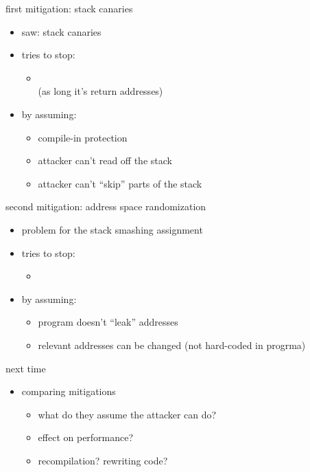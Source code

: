 \begin{frame}{first mitigation: stack canaries}
    \begin{itemize}
    \item saw: stack canaries
    \item tries to stop:
        \begin{itemize}
        \item {} \\
             (as long it's return addresses)
        \end{itemize}
    \item by assuming:
        \begin{itemize}
        \item compile-in protection
        \item attacker can't read off the stack
        \item attacker can't ``skip'' parts of the stack
        \end{itemize}
    \end{itemize}
\end{frame}

\begin{frame}{second mitigation: address space randomization}
    \begin{itemize}
    \item problem for the stack smashing assignment
    \item tries to stop:
        \begin{itemize}
        \item {} \\
        \end{itemize}
    \item by assuming:
        \begin{itemize}
        \item program doesn't ``leak'' addresses
        \item relevant addresses can be changed (not hard-coded in progrma)
        \end{itemize}
    \end{itemize}
\end{frame}

\begin{frame}{next time}
    \begin{itemize}
    \item comparing mitigations
        \begin{itemize}
        \item what do they assume the attacker can do?
        \item effect on performance?
        \item recompilation? rewriting code?
        \end{itemize}
    \end{itemize}
\end{frame}
